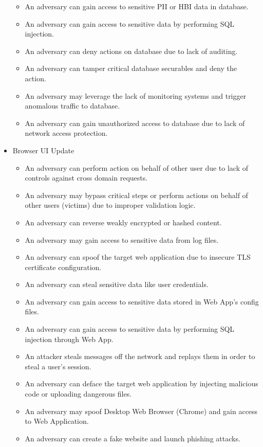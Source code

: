 \begin{itemize}
\begin{itemize}
        \item An adversary can gain access to sensitive PII or HBI data in database.
        \item An adversary can gain access to sensitive data by performing SQL injection.
        \item An adversary can deny actions on database due to lack of auditing.
        \item An adversary can tamper critical database securables and deny the action.
        \item An adversary may leverage the lack of monitoring systems and trigger anomalous traffic to database.
        \item An adversary can gain unauthorized access to database due to lack of network access protection.
    \end{itemize}
    \item Browser UI Update
    \begin{itemize}
        \item An adversary can perform action on behalf of other user due to lack of controls against cross domain requests.
        \item An adversary may bypass critical steps or perform actions on behalf of other users (victims) due to improper validation logic.
        \item An adversary can reverse weakly encrypted or hashed content.
        \item An adversary may gain access to sensitive data from log files.
        \item An adversary can spoof the target web application due to insecure TLS certificate configuration.
        \item An adversary can steal sensitive data like user credentials.
        \item An adversary can gain access to sensitive data stored in Web App's config files.
        \item An adversary can gain access to sensitive data by performing SQL injection through Web App.
        \item An attacker steals messages off the network and replays them in order to steal a user's session.
        \item An adversary can deface the target web application by injecting malicious code or uploading dangerous files.
        \item An adversary may spoof Desktop Web Browser (Chrome) and gain access to Web Application.
        \item An adversary can create a fake website and launch phishing attacks.

\end{itemize}
\end{itemize}
